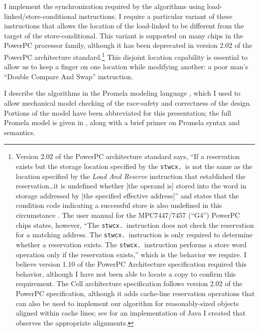 I implement the synchronization required by the \apex algorithms using
load-linked/store-conditional instructions.  I require a particular
variant of these instructions that allows the location of the
load-linked to be different from the target of the store-conditional.
This variant is supported on many chips in the PowerPC processor family,
although it has been deprecated in version 2.02 of the PowerPC
architecture standard.\footnote{Version 2.02 of the PowerPC
architecture standard says, ``If a reservation exists but the storage
location specified by the \texttt{stwcx.}\ is not the same as the
location specified by the \textit{Load And Reserve} instruction that
established the reservation\ldots it is undefined whether [the operand
is] stored into the word in storage addressed by [the specified
effective address]'' and states that the condition code indicating a
successful store is also undefined in this circumstance \cite[p 25]{PPCII202}.
The user manual for the MPC7447/7457 (``G4'') PowerPC chips states,
however, ``The \texttt{stwcx.}\ instruction does not check the
reservation for a matching address.  The \texttt{stwcx.}\ instruction
is only required to determine whether a reservation exists.  The
\texttt{stwcx.}\ instruction performs a store word operation only if
the reservation exists,'' \cite[Section 3.3.3.6]{MPC7450UM} which is
the behavior we require.  I believe version 1.10 of the PowerPC
Architecture specification required this behavior, although I have not
been able to locate a copy to confirm this requirement.  The Cell architecture specification
follows version 2.02 of the PowerPC specification, although it adds
cache-line reservation operations that can also be used to
implement our algorithm for reasonably-sized objects aligned within
cache lines; see \cite{WitchelLaAnAs01} for an implementation of Java
I created that observes the appropriate alignments.}  This disjoint location
capability is essential to allow us to keep a finger on one location
while modifying another: a poor man's ``Double Compare And Swap''
instruction.

I describe the \apex algorithms in the Promela modeling language
\cite{Holzmann03},
which I used to allow mechanical model checking of the race-safety
and correctness of the design.  Portions of the model have been
abbreviated for this presentation;  the full Promela model is
given in , along with a brief primer on Promela
syntax and semantics.

